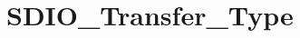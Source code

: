 \hypertarget{group___s_d_i_o___transfer___type}{\section{S\-D\-I\-O\-\_\-\-Transfer\-\_\-\-Type}
\label{group___s_d_i_o___transfer___type}
}
